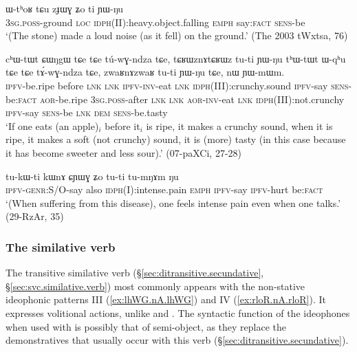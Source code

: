 \begin{exe}
\ex \label{ex:zJWG.Zo}
\gll ɯ-tʰoʁ tɕu zɟɯɣ ʑo ti ɲɯ-ŋu\\
\textsc{3sg}.\textsc{poss}-ground \textsc{loc} \textsc{idph}(II):heavy.object.falling \textsc{emph} say:\textsc{fact} \textsc{sens}-be\\
\glt `(The stone) made a loud noise (as it fell) on the ground.' (The 2003 tWxtsa, 76)
\end{exe}


\begin{exe}
\ex \label{ex:tCRWz.nA.tCRWz}
\gll cʰɯ-tɯt ɕɯŋgɯ tɕe tɕe tú-wɣ-ndza tɕe, tɕʁɯznɤtɕʁɯz tu-ti ɲɯ-ŋu tʰɯ-tɯt ɯ-qʰu tɕe tɕe tɤ́-wɣ-ndza tɕe, zwaʁnɤzwaʁ tu-ti ɲɯ-ŋu tɕe, nɯ ɲɯ-mɯm. \\
\textsc{ipfv}-be.ripe before \textsc{lnk} \textsc{lnk} \textsc{ipfv}-\textsc{inv}-eat \textsc{lnk} \textsc{idph}(III):crunchy.sound \textsc{ipfv}-say \textsc{sens}-be:\textsc{fact} \textsc{aor}-be.ripe \textsc{3sg}.\textsc{poss}-after \textsc{lnk} \textsc{lnk} \textsc{aor}-\textsc{inv}-eat \textsc{lnk} \textsc{idph}(III):not.crunchy \textsc{ipfv}-say \textsc{sens}-be \textsc{lnk} \textsc{dem} \textsc{sens}-be.tasty \\
\glt `If one eats (an apple)$_i$ before it$_i$ is ripe, it makes a crunchy sound, when it is ripe, it makes a soft (not crunchy) sound, it is (more) tasty (in this case because it has become sweeter and less sour).' (07-paXCi, 27-28)
\end{exe}

\begin{exe}
\ex \label{ex:CYWG.Zo}
\gll tu-kɯ-ti kɯnɤ ɕɲɯɣ ʑo tu-ti tu-mŋɤm ŋu \\
\textsc{ipfv}-\textsc{genr}:S/O-say also \textsc{idph}(I):intense.pain \textsc{emph} \textsc{ipfv}-say \textsc{ipfv}-hurt be:\textsc{fact} \\
\glt `(When suffering from this disease), one feels intense pain even when one talks.' (29-RzAr, 35)
\end{exe}


\subsubsection{The similative verb  } \label{sec:stu.idph} 
The transitive similative verb   (§\ref{sec:ditransitive.secundative}, §\ref{sec:svc.similative.verb}) most commonly appears with the non-stative ideophonic patterns III (\ref{ex:lhWG.nA.lhWG})  and IV (\ref{ex:rloR.nA.rloR}). It expresses volitional actions, unlike  and .  The syntactic function of the ideophones when used with  is possibly that of semi-object, as they replace the demonstratives that usually occur with this verb (§\ref{sec:ditransitive.secundative}).

